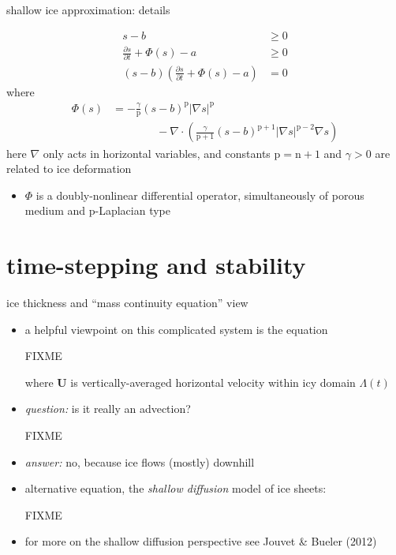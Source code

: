 \documentclass[svgnames,
               hyperref={colorlinks,citecolor=DeepPink4,linkcolor=FireBrick,urlcolor=Maroon},
               usepdftitle=false]  %
               {beamer}
\newcommand{\grad}{\nabla}
\newcommand{\bU}{\mathbf{U}}
\newcommand{\nn}{{\text{n}}}
\newcommand{\pp}{{\text{p}}}
\begin{document}
\begin{frame}{shallow ice approximation: details}

{\small
\begin{align*}
s - b &\ge 0 \\
\frac{\partial s}{\partial t} + \Phi(s) - a &\ge 0 \\
(s - b) \left(\frac{\partial s}{\partial t} + \Phi(s) - a\right) &= 0
\end{align*}
where
\begin{align*}
\Phi(s) &= - \frac{\gamma}{\pp} (s-b)^{\pp} |\grad s|^{\pp} \\
        &\qquad\qquad - \grad \cdot\left(\frac{\gamma}{\pp+1} (s-b)^{\pp+1} |\grad s|^{\pp-2} \grad s\right)
\end{align*}
here $\nabla$ only acts in horizontal variables, and constants $\pp = \nn+1$ and $\gamma > 0$ are related to ice deformation

\begin{itemize}
\item $\Phi$ is a \alert{doubly-nonlinear differential operator}, simultaneously of porous medium and $\pp$-Laplacian type
\end{itemize}
}
\end{frame}


\section{time-stepping and stability}

\begin{frame}{ice thickness and ``mass continuity equation'' view}

\begin{itemize}
\item a helpful viewpoint on this complicated system is the equation

FIXME

where $\bU$ is vertically-averaged horizontal velocity within icy domain $\Lambda(t)$
\item \emph{question:} is it really an advection?

FIXME

\item[] \emph{answer:} no, because ice flows (mostly) downhill

\item alternative equation, the \emph{shallow diffusion} model of ice sheets:

FIXME
\bigskip
\item<2> {\footnotesize for more on the shallow diffusion perspective see Jouvet \& Bueler (2012)}
\end{itemize}
\end{frame}
\end{document}
